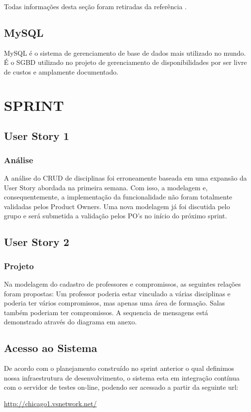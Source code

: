 \documentclass{abnt}
\begin{document}
			Todas informações desta seção foram retiradas da referência \cite{KLAROS}.
			
	\section{MySQL}

		MySQL é o sistema de gerenciamento de base de dados mais utilizado no mundo.
		É o SGBD utilizado no projeto de gerenciamento de disponibilidades por ser livre de custos
		e amplamente documentado.\cite{MYSQLWIKI}
	
\clearpage
\chapter{SPRINT}
	
	\blindtext
	\section{User Story 1}
	\subsection{Análise}
		A análise do CRUD de disciplinas foi erroneamente baseada em uma expansão da User Story abordada na primeira semana. Com isso, a modelagem e, consequentemente, a implementação da funcionalidade não foram totalmente validadas pelos Product Owners.
		Uma nova modelagem já foi discutida pelo grupo e será submetida a validação pelos PO's no início do próximo sprint.
	
	\section{User Story 2}
	\subsection{Projeto}
	Na modelagem do cadastro de professores e compromissos, as seguintes relações foram propostas:
	Um professor poderia estar vinculado a várias disciplinas e poderia ter vários compromissos, mas apenas uma área de formação.
	Salas também poderiam ter compromissos.
	A sequencia de mensagens está demonstrado através do diagrama em anexo.

\clearpage

\section{Acesso ao Sistema}
		De acordo com o planejamento construído no sprint anterior o qual definimos nossa infraestrutura de desenvolvimento, 
		o sistema esta em integração contínua com o servidor de testes on-line, podendo ser acessado a partir da seguinte url:
	
		\url{http://chicago1.vsnetwork.net/}

\clearpage

\nocite{*}

%		
		
\end{document}
